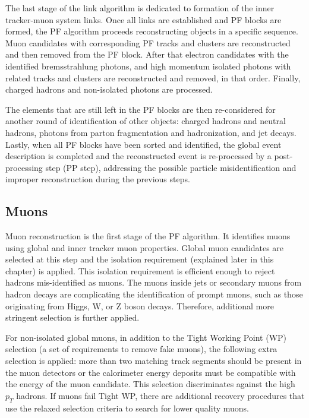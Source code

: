 The last stage of the link algorithm is dedicated to formation of the inner tracker-muon system links. Once all links are established and PF blocks are formed, the PF algorithm proceeds reconstructing objects in a specific sequence. Muon candidates with corresponding PF tracks and clusters are reconstructed and then removed from the PF block. After that electron candidates with the identified bremsstrahlung photons, and high momentum isolated photons with related tracks and clusters are reconstructed and removed, in that order. Finally, charged hadrons and non-isolated photons are processed.

The elements that are still left in the PF blocks are then re-considered for another round of identification of other objects: charged hadrons and neutral hadrons, photons from parton fragmentation and hadronization, and jet decays. Lastly, when all PF blocks have been sorted and identified, the global event description is completed and the reconstructed event is re-processed by a post-processing step (PP step), addressing the possible particle misidentification and improper reconstruction during the previous steps. 

\subsection{Muons}\label{sec:muons}

Muon reconstruction is the first stage of the PF algorithm. It identifies muons using global and inner tracker muon properties. Global muon candidates are selected at this step and the isolation requirement (explained later in this chapter) is applied. This isolation requirement is efficient enough to reject hadrons mis-identified as muons. The muons inside jets or secondary muons from hadron decays are complicating the identification of prompt muons, such as those originating from Higgs, W, or Z boson decays. Therefore, additional more stringent selection is further applied. 

For non-isolated global muons, in addition to the Tight Working Point (WP) selection (a set of requirements to remove fake muons), the following extra selection is applied: more than two matching track segments should be present in the muon detectors or the calorimeter energy deposits must be compatible with the energy of the muon candidate. This selection discriminates against the high $p_T$ hadrons. If muons fail Tight WP, there are additional recovery procedures that use the relaxed selection criteria to search for lower quality muons.

